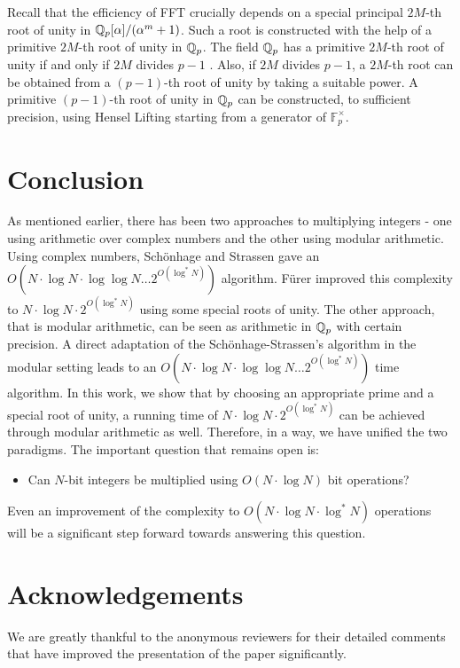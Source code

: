 \documentclass[11pt]{article}
\begin{document}
Recall that the efficiency of FFT crucially depends on a special
principal $2M$-th root of unity in $\mathbb{Q}_p[\alpha]/(\alpha^m + 1)$. Such
a root is constructed with the help of a primitive $2M$-th root of
unity in $\mathbb{Q}_p$. The field $\mathbb{Q}_p$ has a primitive $2M$-th root of
unity if and only if $2M$ divides $p-1$ \cite[Theorem
  5.12]{Baker}. Also, if $2M$ divides $p-1$, a $2M$-th root can be
obtained from a $(p-1)$-th root of unity by taking a suitable power. A
primitive $(p-1)$-th root of unity in $\mathbb{Q}_p$ can be constructed, to
sufficient precision, using Hensel Lifting starting from a generator
of $\mathbb{F}_p^{\times}$.

\section{Conclusion}\label{conclusions_section}

As mentioned earlier, there has been two approaches to multiplying
integers - one using arithmetic over complex numbers and the other
using modular arithmetic. Using complex numbers, Sch\"{o}nhage and
Strassen \cite{SS71} gave an $O(N \cdot \log N \cdot \log\log N\ldots
2^{O(\log^* N)})$ algorithm. F\"{u}rer \cite{F07} improved this
complexity to $N\cdot\log N \cdot2^{O(\log^*N)}$ using some special
roots of unity. The other approach, that is modular arithmetic, can be
seen as arithmetic in $\mathbb{Q}_p$ with certain precision. A direct
adaptation of the Sch\"{o}nhage-Strassen's algorithm in the modular
setting leads to an $O(N \cdot \log N \cdot \log\log N\ldots
2^{O(\log^* N)})$ time algorithm. In this work, we show that by
choosing an appropriate prime and a special root of unity, a running
time of $N\cdot \log N \cdot 2^{O(\log^*N)}$ can be achieved through
modular arithmetic as well. Therefore, in a way, we have unified the
two paradigms. The important question that remains open is:
\begin{itemize}
\item Can $N$-bit integers be multiplied using $O(N \cdot \log N)$ bit operations?
\end{itemize}

\noindent Even an improvement of the complexity to $O(N \cdot \log N
\cdot \log^{*}N)$ operations will be a significant step forward
towards answering this question.

\section*{Acknowledgements}

We are greatly thankful to the anonymous reviewers for their detailed
comments that have improved the presentation of the paper
significantly.



\end{document}
